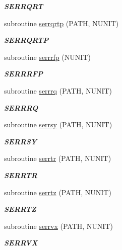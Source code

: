 \begin{DoxyCompactItemize}
\begin{DoxyCompactList}\small\item\em {\bfseries S\+E\+R\+R\+Q\+R\+T} \end{DoxyCompactList}\item 
subroutine \hyperlink{group__single__lin_gae304c2e4597397b9ef55e65111513d90}{serrqrtp} (P\+A\+T\+H, N\+U\+N\+I\+T)
\begin{DoxyCompactList}\small\item\em {\bfseries S\+E\+R\+R\+Q\+R\+T\+P} \end{DoxyCompactList}\item 
subroutine \hyperlink{group__single__lin_ga45472e075e22e5671a95d57eeb243339}{serrrfp} (N\+U\+N\+I\+T)
\begin{DoxyCompactList}\small\item\em {\bfseries S\+E\+R\+R\+R\+F\+P} \end{DoxyCompactList}\item 
subroutine \hyperlink{group__single__lin_gaa87d8560c548262478ca24470be1c99d}{serrrq} (P\+A\+T\+H, N\+U\+N\+I\+T)
\begin{DoxyCompactList}\small\item\em {\bfseries S\+E\+R\+R\+R\+Q} \end{DoxyCompactList}\item 
subroutine \hyperlink{group__single__lin_ga24d3e1d20c64603f4b59af44400df999}{serrsy} (P\+A\+T\+H, N\+U\+N\+I\+T)
\begin{DoxyCompactList}\small\item\em {\bfseries S\+E\+R\+R\+S\+Y} \end{DoxyCompactList}\item 
subroutine \hyperlink{group__single__lin_ga6ae65de4b57faf8ad0ac765556d941ee}{serrtr} (P\+A\+T\+H, N\+U\+N\+I\+T)
\begin{DoxyCompactList}\small\item\em {\bfseries S\+E\+R\+R\+T\+R} \end{DoxyCompactList}\item 
subroutine \hyperlink{group__single__lin_gaf972dfdcb97e2b6bf71eb64feb4128bf}{serrtz} (P\+A\+T\+H, N\+U\+N\+I\+T)
\begin{DoxyCompactList}\small\item\em {\bfseries S\+E\+R\+R\+T\+Z} \end{DoxyCompactList}\item 
subroutine \hyperlink{group__single__lin_ga4c4c9aed297cce5147164ac35114a262}{serrvx} (P\+A\+T\+H, N\+U\+N\+I\+T)
\begin{DoxyCompactList}\small\item\em {\bfseries S\+E\+R\+R\+V\+X} \end{DoxyCompactList}\item 

\end{DoxyCompactItemize}
